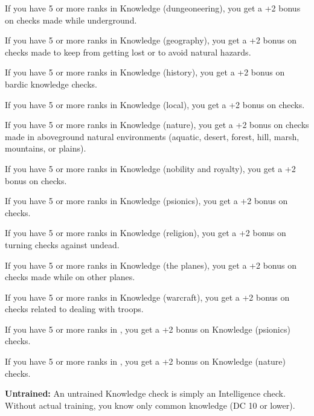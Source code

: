 If you have 5 or more ranks in Knowledge (dungeoneering), you get a +2 bonus on  checks made while underground.

If you have 5 or more ranks in Knowledge (geography), you get a +2 bonus on  checks made to keep from getting lost or to avoid natural hazards.

If you have 5 or more ranks in Knowledge (history), you get a +2 bonus on bardic knowledge checks.

If you have 5 or more ranks in Knowledge (local), you get a +2 bonus on  checks.

If you have 5 or more ranks in Knowledge (nature), you get a +2 bonus on  checks made in aboveground natural environments (aquatic, desert, forest, hill, marsh, mountains, or plains).

If you have 5 or more ranks in Knowledge (nobility and royalty), you get a +2 bonus on  checks.

If you have 5 or more ranks in Knowledge (psionics), you get a +2 bonus on  checks.

If you have 5 or more ranks in Knowledge (religion), you get a +2 bonus on turning checks against undead.

If you have 5 or more ranks in Knowledge (the planes), you get a +2 bonus on  checks made while on other planes.

If you have 5 or more ranks in Knowledge (warcraft), you get a +2 bonus on  checks related to dealing with troops.

If you have 5 or more ranks in , you get a +2 bonus on Knowledge (psionics) checks.

If you have 5 or more ranks in , you get a +2 bonus on Knowledge (nature) checks.

\textbf{Untrained:} An untrained Knowledge check is simply an Intelligence check. Without actual training, you know only common knowledge (DC 10 or lower).


